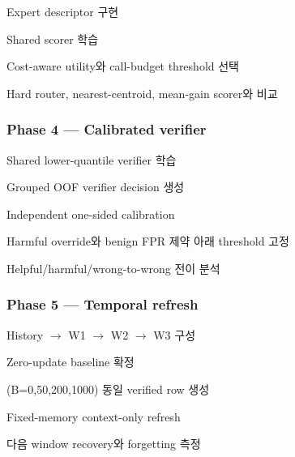 \par\noindent \textbullet\enspace Expert descriptor 구현


\par\noindent \textbullet\enspace Shared scorer 학습


\par\noindent \textbullet\enspace Cost-aware utility와 call-budget threshold 선택


\par\noindent \textbullet\enspace Hard router, nearest-centroid, mean-gain scorer와 비교


\subsubsection{Phase 4 — Calibrated verifier}
\par\noindent \textbullet\enspace Shared lower-quantile verifier 학습


\par\noindent \textbullet\enspace Grouped OOF verifier decision 생성


\par\noindent \textbullet\enspace Independent one-sided calibration


\par\noindent \textbullet\enspace Harmful override와 benign FPR 제약 아래 threshold 고정


\par\noindent \textbullet\enspace Helpful/\allowbreak{}harmful/\allowbreak{}wrong-to-wrong 전이 분석


\subsubsection{Phase 5 — Temporal refresh}
\par\noindent \textbullet\enspace History \ensuremath{\rightarrow} W1 \ensuremath{\rightarrow} W2 \ensuremath{\rightarrow} W3 구성


\par\noindent \textbullet\enspace Zero-update baseline 확정


\par\noindent \textbullet\enspace (B=\allowbreak{}0,50,200,1000) 동일 verified row 생성


\par\noindent \textbullet\enspace Fixed-memory context-only refresh


\par\noindent \textbullet\enspace 다음 window recovery와 forgetting 측정



